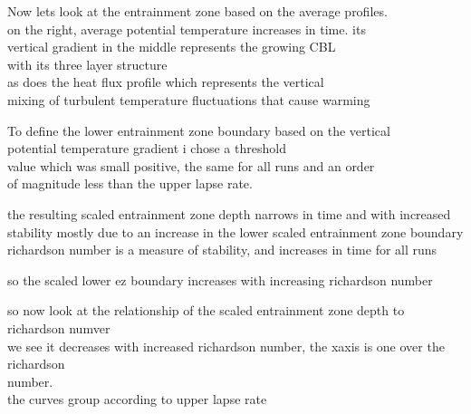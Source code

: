 \documentclass{beamer}
\begin{document}
\begin{frame}
Now lets look at the entrainment zone based on the average profiles.\\
on the right, average potential temperature increases in time.   its\\
vertical gradient in the middle represents the growing CBL\\
with its three layer structure\\
as does the heat flux profile which represents the vertical\\
mixing of turbulent temperature fluctuations that cause warming\\
\end{frame}

\begin{frame}
To define the lower entrainment zone boundary based on the vertical\\
potential temperature gradient i chose a threshold\\
value which was small positive, the same for all runs and an order\\
of magnitude less than the upper lapse rate.\\
\end{frame}

\begin{frame}
the resulting scaled entrainment zone depth narrows in time and with increased\\
stability mostly due to an increase in the lower scaled entrainment zone boundary\\
richardson number is a measure of stability, and increases in time for all runs\\
\end{frame}

\begin{frame}
so the scaled lower ez boundary increases with increasing richardson number\\
\end{frame}


\begin{frame}
so now look at the relationship of the scaled entrainment zone depth to richardson numver\\
we see it decreases with increased richardson number, the xaxis is one over the richardson\\
number.\\
the curves group according to upper lapse rate\\
\end{frame}
\end{document}

